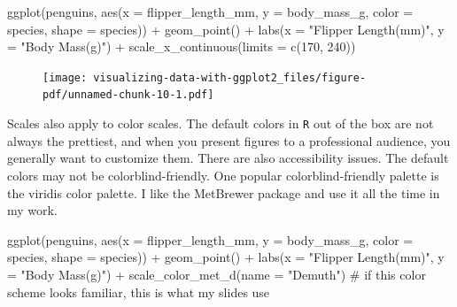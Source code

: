 \documentclass[
  letterpaper,
  DIV=11,
  numbers=noendperiod,
  oneside]{scrreprt}
\newenvironment{Shaded}{\begin{snugshade}}{\end{snugshade}}
\newcommand{\AttributeTok}[1]{\textcolor[rgb]{0.40,0.45,0.13}{#1}}
\newcommand{\CommentTok}[1]{\textcolor[rgb]{0.37,0.37,0.37}{#1}}
\newcommand{\DecValTok}[1]{\textcolor[rgb]{0.68,0.00,0.00}{#1}}
\newcommand{\FunctionTok}[1]{\textcolor[rgb]{0.28,0.35,0.67}{#1}}
\newcommand{\NormalTok}[1]{\textcolor[rgb]{0.00,0.23,0.31}{#1}}
\newcommand{\SpecialCharTok}[1]{\textcolor[rgb]{0.37,0.37,0.37}{#1}}
\newcommand{\StringTok}[1]{\textcolor[rgb]{0.13,0.47,0.30}{#1}}
\begin{document}
\begin{Shaded}
\begin{Highlighting}[]
\FunctionTok{ggplot}\NormalTok{(penguins,}
      \FunctionTok{aes}\NormalTok{(}\AttributeTok{x =}\NormalTok{ flipper\_length\_mm,}
          \AttributeTok{y =}\NormalTok{ body\_mass\_g,}
          \AttributeTok{color =}\NormalTok{ species,}
          \AttributeTok{shape =}\NormalTok{ species)) }\SpecialCharTok{+}
\FunctionTok{geom\_point}\NormalTok{() }\SpecialCharTok{+}
\FunctionTok{labs}\NormalTok{(}\AttributeTok{x =} \StringTok{"Flipper Length(mm)"}\NormalTok{, }\AttributeTok{y =} \StringTok{"Body Mass(g)"}\NormalTok{) }\SpecialCharTok{+}
\FunctionTok{scale\_x\_continuous}\NormalTok{(}\AttributeTok{limits =} \FunctionTok{c}\NormalTok{(}\DecValTok{170}\NormalTok{, }\DecValTok{240}\NormalTok{))}
\end{Highlighting}
\end{Shaded}

\begin{figure}[H]

{\centering \texttt{[image: visualizing-data-with-ggplot2\_files/figure-pdf/unnamed-chunk-10-1.pdf]}

}

\end{figure}

Scales also apply to color scales. The default colors in \texttt{R} out
of the box are not always the prettiest, and when you present figures to
a professional audience, you generally want to customize them. There are
also accessibility issues. The default colors may not be
colorblind-friendly. One popular colorblind-friendly palette is the
viridis color palette. I like the MetBrewer package and use it all the
time in my work.

\begin{Shaded}
\begin{Highlighting}[]
\FunctionTok{ggplot}\NormalTok{(penguins,}
      \FunctionTok{aes}\NormalTok{(}\AttributeTok{x =}\NormalTok{ flipper\_length\_mm,}
          \AttributeTok{y =}\NormalTok{ body\_mass\_g,}
          \AttributeTok{color =}\NormalTok{ species,}
          \AttributeTok{shape =}\NormalTok{ species)) }\SpecialCharTok{+}
\FunctionTok{geom\_point}\NormalTok{() }\SpecialCharTok{+}
\FunctionTok{labs}\NormalTok{(}\AttributeTok{x =} \StringTok{"Flipper Length(mm)"}\NormalTok{, }\AttributeTok{y =} \StringTok{"Body Mass(g)"}\NormalTok{) }\SpecialCharTok{+}
\FunctionTok{scale\_color\_met\_d}\NormalTok{(}\AttributeTok{name =} \StringTok{"Demuth"}\NormalTok{) }\CommentTok{\# if this color scheme looks familiar, this is what my slides use}
\end{Highlighting}
\end{Shaded}
\end{document}
